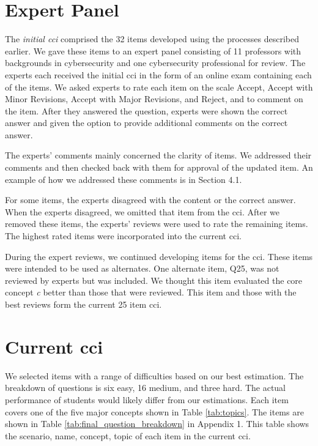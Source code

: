 \section{Expert Panel}


The \emph{initial \gls{cci}} comprised the 32 items developed using the processes described earlier. We gave these items to an expert panel consisting of 11 professors with backgrounds in cybersecurity and one cybersecurity professional for review. The experts each received the initial \gls{cci} in the form of an online exam containing each of the items. We asked experts to rate each item on the scale Accept, Accept with Minor Revisions, Accept with Major Revisions, and Reject, and to comment on the item. After they answered the question, experts were shown the correct answer and given the option to provide additional comments on the correct answer. 

\iflong

The experts' comments mainly concerned the clarity of items. We addressed their comments and then checked back with them for approval of the updated item. An example of how we addressed these comments is in Section 4.1. 

For some items, the experts disagreed with the content or the correct answer. When the experts disagreed, we omitted that item from the \gls{cci}. After we removed these items, the experts' reviews were used to rate the remaining items. The highest rated items were incorporated into the current \gls{cci}.

During the expert reviews, we continued developing items for the \gls{cci}. These items were intended to be used as alternates. One alternate item, Q25, was not reviewed by experts but was included. We thought this item evaluated the core concept \textit{\gls{c}} better than those that were reviewed. This item and those with the best reviews form the current 25 item \gls{cci}.

\fi


\section{Current \gls{cci}}

We selected items with a range of difficulties based on our best estimation. The breakdown of questions is six easy, 16 medium, and three hard. The actual performance of students would likely differ from our estimations. Each item covers one of the five major concepts shown in Table \ref{tab:topics}. \iflong The items are shown in Table \ref{tab:final_question_breakdown} in Appendix 1. This table shows the scenario, name, concept, topic of each item in the current \gls{cci}.\fi  



